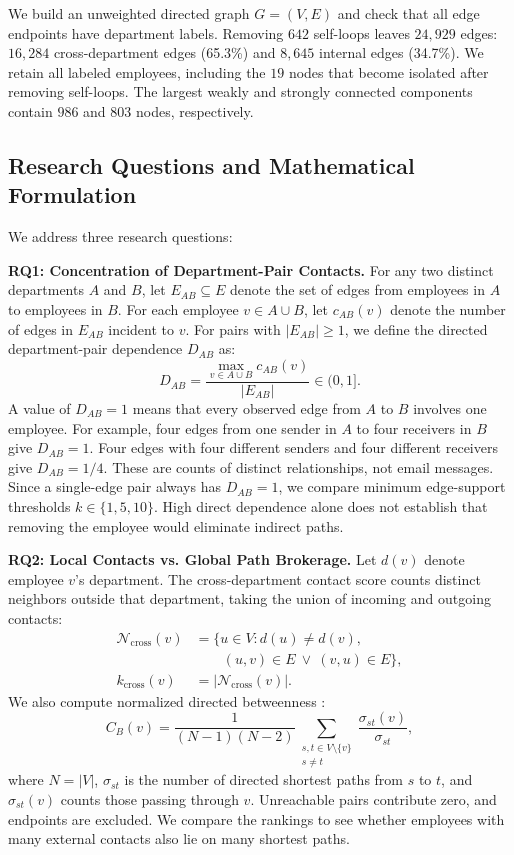\documentclass[conference]{IEEEtran}
\begin{document}
We build an unweighted directed graph $G=(V,E)$ and check that all edge endpoints have department labels. Removing $642$ self-loops leaves $24,929$ edges: $16,284$ cross-department edges (65.3\%) and $8,645$ internal edges (34.7\%). We retain all labeled employees, including the $19$ nodes that become isolated after removing self-loops. The largest weakly and strongly connected components contain $986$ and $803$ nodes, respectively.

\subsection{Research Questions and Mathematical Formulation}
We address three research questions:

\textbf{RQ1: Concentration of Department-Pair Contacts.} For any two distinct departments $A$ and $B$, let $E_{AB} \subseteq E$ denote the set of edges from employees in $A$ to employees in $B$. For each employee $v \in A \cup B$, let $c_{AB}(v)$ denote the number of edges in $E_{AB}$ incident to $v$. For pairs with $|E_{AB}| \ge 1$, we define the directed department-pair dependence $D_{AB}$ as:
\begin{equation}
    D_{AB} = \frac{\max_{v \in A \cup B} c_{AB}(v)}{|E_{AB}|} \in (0, 1].
\end{equation}
A value of $D_{AB}=1$ means that every observed edge from $A$ to $B$ involves one employee. For example, four edges from one sender in $A$ to four receivers in $B$ give $D_{AB}=1$. Four edges with four different senders and four different receivers give $D_{AB}=1/4$. These are counts of distinct relationships, not email messages. Since a single-edge pair always has $D_{AB}=1$, we compare minimum edge-support thresholds $k\in\{1,5,10\}$. High direct dependence alone does not establish that removing the employee would eliminate indirect paths.

\textbf{RQ2: Local Contacts vs. Global Path Brokerage.} Let $d(v)$ denote employee $v$'s department. The cross-department contact score counts distinct neighbors outside that department, taking the union of incoming and outgoing contacts:
\begin{equation}
\begin{aligned}
\mathcal{N}_{\mathrm{cross}}(v)&=\{u\in V:d(u)\ne d(v),\\
&\qquad (u,v)\in E\ \lor\ (v,u)\in E\},\\
k_{\mathrm{cross}}(v)&=|\mathcal{N}_{\mathrm{cross}}(v)|.
\end{aligned}
\end{equation}
We also compute normalized directed betweenness \cite{brandes2001faster}:
\begin{equation}
C_B(v)=\frac{1}{(N-1)(N-2)}
\sum_{\substack{s,t\in V\setminus\{v\}\\s\ne t}}
\frac{\sigma_{st}(v)}{\sigma_{st}},
\end{equation}
where $N=|V|$, $\sigma_{st}$ is the number of directed shortest paths from $s$ to $t$, and $\sigma_{st}(v)$ counts those passing through $v$. Unreachable pairs contribute zero, and endpoints are excluded. We compare the rankings to see whether employees with many external contacts also lie on many shortest paths.
\end{document}
